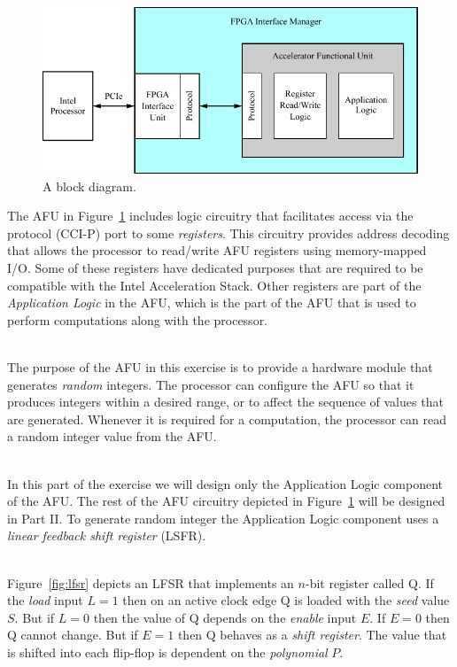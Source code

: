 \documentclass[epsfig,10pt,fullpage]{article}
\begin{document}
~\\
\begin{figure}[H]
   \begin{center}
       \includegraphics[scale=1.0]{figures/block.pdf}
   \end{center}
   \caption{A block diagram.}
	\label{fig:block}
\end{figure}

\newpage
\noindent
The AFU in Figure~\ref{fig:block} includes logic circuitry that facilitates access via
the protocol (CCI-P) port to some {\it registers}.
This circuitry provides address decoding that allows the processor to read/write 
AFU registers using memory-mapped I/O. Some of these registers have dedicated purposes 
that are required to be compatible with the Intel Acceleration Stack. Other registers are part
of the {\it Application Logic} in the AFU, which is the part of the AFU that is used to
perform computations along with the processor.

~\\
\noindent
The purpose of the AFU in this exercise is to provide a hardware module that generates 
{\it random} integers. The processor can configure the AFU so that it produces integers 
within a desired range, or to affect the sequence of values that are generated. Whenever
it is required for a computation, the processor can read a random integer value from the AFU.

~\\
\noindent
In this part of the exercise we will design only the Application Logic component of the AFU. 
The rest of the AFU circuitry depicted in Figure~\ref{fig:block} will be designed
in Part II. To generate random integer the Application Logic component uses a  
{\it linear feedback shift register} (LSFR).

~\\
\noindent
Figure~\ref{fig:lfsr} depicts an LFSR that implements an $n$-bit register
called Q. If the {\it load} input $L = 1$ then on an active clock edge Q is loaded with 
the {\it seed} value $S$. But if $L = 0$ then the value of Q depends on the {\it enable}
input $E$. If $E = 0$ then Q cannot change. But if $E = 1$ then Q behaves
as a {\it shift register}. The value that is shifted into each flip-flop is dependent 
on the {\it polynomial} $P$. 
\end{document}
